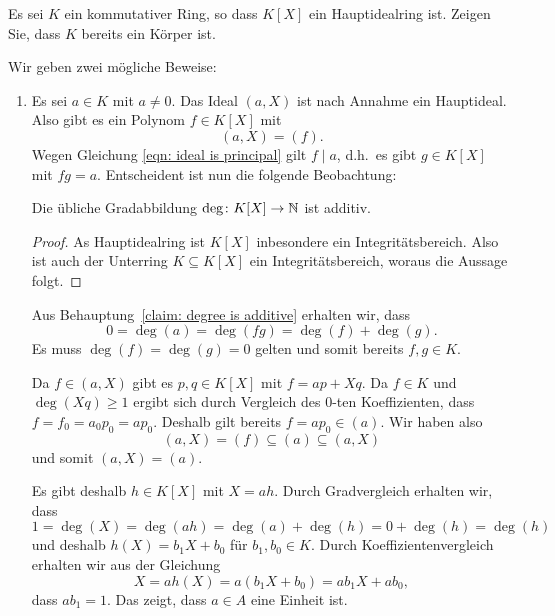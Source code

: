 \begin{question}[subtitle = Polynomringe als Hauptidealringe]
  \label{question: fields are the only rings for which the polynomial ring is a pid}
  Es sei $K$ ein kommutativer Ring, so dass $K[X]$ ein Hauptidealring ist.
  Zeigen Sie, dass $K$ bereits ein Körper ist.
\end{question}


\begin{solution}
  Wir geben zwei mögliche Beweise:  
  \begin{enumerate}
    \item
      Es sei $a \in K$ mit $a \neq 0$.
      Das Ideal $(a, X)$ ist nach Annahme ein Hauptideal.
      Also gibt es ein Polynom $f \in K[X]$ mit
      \begin{equation}
        \label{eqn: ideal is principal}
        (a, X) = (f).
      \end{equation}
      Wegen Gleichung \eqref{eqn: ideal is principal} gilt $f \mid a$, d.h.\ es gibt $g \in K[X]$ mit $fg = a$.
      Entscheident ist nun die folgende Beobachtung:
      
      \begin{claim}
        \label{claim: degree is additive}
        Die übliche Gradabbildung $\deg \colon K[X] \to \mathbb{N}$ ist additiv.
      \end{claim}
      \begin{proof}
        As Hauptidealring ist $K[X]$ inbesondere ein Integritätsbereich.
        Also ist auch der Unterring $K \subseteq K[X]$ ein Integritätsbereich, woraus die Aussage folgt.
      \end{proof}
      Aus Behauptung~\ref{claim: degree is additive} erhalten wir, dass
      \[
          0
        = \deg(a)
        = \deg(fg)
        = \deg(f) + \deg(g).
      \]
      Es muss $\deg(f) = \deg(g) = 0$ gelten und somit bereits $f, g \in K$.
      
      Da $f \in (a, X)$ gibt es $p, q \in K[X]$ mit $f = a p + X q$.
      Da $f \in K$ und $\deg(X q) \geq 1$ ergibt sich durch Vergleich des $0$-ten Koeffizienten, dass $f = f_0 = a_0 p_0 = a p_0$.
      Deshalb gilt bereits $f = a p_0 \in (a)$.
      Wir haben also
      \[
                  (a, X)
        =         (f)
        \subseteq (a)
        \subseteq (a, X)
      \]
      und somit $(a, X) = (a)$.
      
      Es gibt deshalb $h \in K[X]$ mit $X = a h$.
      Durch Gradvergleich erhalten wir, dass
      \[
          1
        = \deg(X)
        = \deg(a h)
        = \deg(a) + \deg(h)
        = 0 + \deg(h)
        = \deg(h)
      \]
      und deshalb $h(X) = b_1 X + b_0$ für $b_1, b_0 \in K$.
      Durch Koeffizientenvergleich erhalten wir aus der Gleichung
      \[
          X
        = a h(X)
        = a (b_1 X + b_0)
        = a b_1 X + a b_0,
      \]
      dass $a b_1 = 1$.
      Das zeigt, dass $a \in A$ eine Einheit ist.
      

\end{enumerate}
\end{solution}
